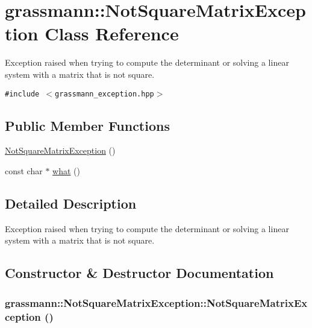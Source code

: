 \hypertarget{classgrassmann_1_1NotSquareMatrixException}{
\section{grassmann::NotSquareMatrixException Class Reference}
\label{classgrassmann_1_1NotSquareMatrixException}
}
Exception raised when trying to compute the determinant or solving a linear system with a matrix that is not square.  


{\tt \#include $<$grassmann\_\-exception.hpp$>$}

\subsection*{Public Member Functions}
\begin{CompactItemize}
\item 
\hyperlink{classgrassmann_1_1NotSquareMatrixException_61fd3c48f615478da87b29f2e1d95037}{NotSquareMatrixException} ()
\item 
const char $\ast$ \hyperlink{classgrassmann_1_1NotSquareMatrixException_95dca75bbfe447e3a36449fb0087f646}{what} ()
\end{CompactItemize}


\subsection{Detailed Description}
Exception raised when trying to compute the determinant or solving a linear system with a matrix that is not square. 

\subsection{Constructor \& Destructor Documentation}
\hypertarget{classgrassmann_1_1NotSquareMatrixException_61fd3c48f615478da87b29f2e1d95037}{
\subsubsection[NotSquareMatrixException]{\setlength{\rightskip}{0pt plus 5cm}grassmann::NotSquareMatrixException::NotSquareMatrixException ()}}
\label{classgrassmann_1_1NotSquareMatrixException_61fd3c48f615478da87b29f2e1d95037}




